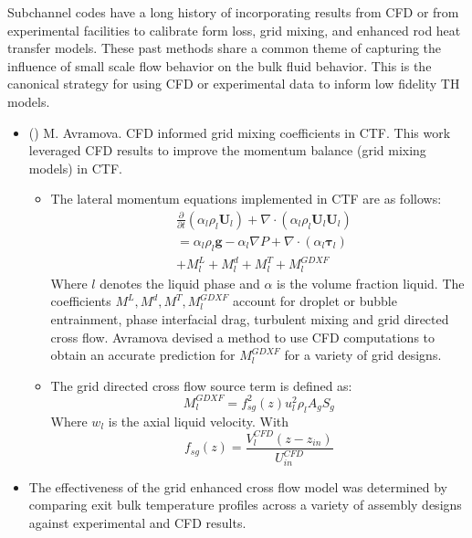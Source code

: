 
Subchannel codes have a long history of incorporating results from CFD or from experimental facilities to calibrate form loss, grid mixing, and enhanced rod heat transfer models.  These past methods share a common theme of capturing the influence of small scale flow behavior on the bulk fluid behavior.  This is the canonical strategy for using CFD or experimental data to inform low fidelity TH models.

\begin{itemize}
    \item (\checkmark) M. Avramova.  CFD informed grid mixing coefficients in CTF.  This work leveraged CFD results to improve the momentum balance (grid mixing models) in CTF. \cite{avramova2007}
        \begin{itemize}
            \item The lateral momentum equations implemented in CTF are as follows:
                \begin{align}
                    & \frac{\partial }{\partial t}(\alpha_l \rho_l \mathbf U_l)
                    + \nabla \cdot (\alpha_l \rho_l \mathbf U_l \mathbf U_l) \nonumber \\
                    &= \alpha_l \rho_l \mathbf{g} - \alpha_l \nabla P + 
                    \nabla \cdot (\alpha_l \bm{\tau}_l) \nonumber \\
                    &+ M^L_l + M^d_l + M^T_l + M_l^{GDXF}
                \end{align}
                Where $l$ denotes the liquid phase and $\alpha$ is the volume fraction liquid.  The coefficients $M^L, M^d, M^T, M_l^{GDXF}$ account for droplet or bubble entrainment, phase interfacial drag, turbulent mixing and grid directed cross flow.  Avramova devised a method to use CFD computations to obtain an accurate prediction for $M_l^{GDXF}$ for a variety of grid designs.
            \item The grid directed cross flow source term is defined as:
                \begin{equation}
                    M_l^{GDXF} = f^2_{sg}(z) u_l^2 \rho_l A_g S_g
                \end{equation}
                Where $w_l$ is the axial liquid velocity.
                With
                \begin{equation}
                    f_{sg}(z) = \frac{V^{CFD}_l(z-z_{in})}{U^{CFD}_{in}}
                \end{equation}
        \end{itemize}
            \item The effectiveness of the grid enhanced cross flow model was determined by comparing exit bulk temperature profiles across a variety of assembly designs against experimental and CFD results.
        \end{itemize}
